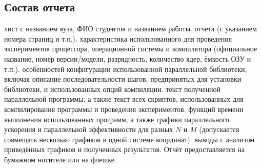 { %
	\subsection{Состав отчета}
	\begin{enumerate}
		 лист с названием вуза, ФИО студентов и названием работы.
		 отчета (с указанием номера страниц и т.п.).
		 характеристика использованного для проведения экспериментов процессора, операционной системы и компилятора (официальное название, номер версии/модели, разрядность, количество ядер, ёмкость ОЗУ и т.п.).
		 особенностей конфигурации использованной параллельной библиотеки, включая описание последовательности шагов, предпринятых для установки библиотеки, и использованных опций компиляции.
		 текст полученной параллельной программы, а также текст всех скриптов, использованных для компилирования программы и проведения экспериментов.
		 функций времени выполнения использованных программ, а также графики параллельного ускорения и параллельной эффективности для разных $N$ и $M$ (допускается совмещать несколько графиков в одной системе координат).
		 выводы с анализом приведённых графиков и полученных результатов. Отчёт предоставляется на бумажном носителе или на флешке.
	\end{enumerate}
}